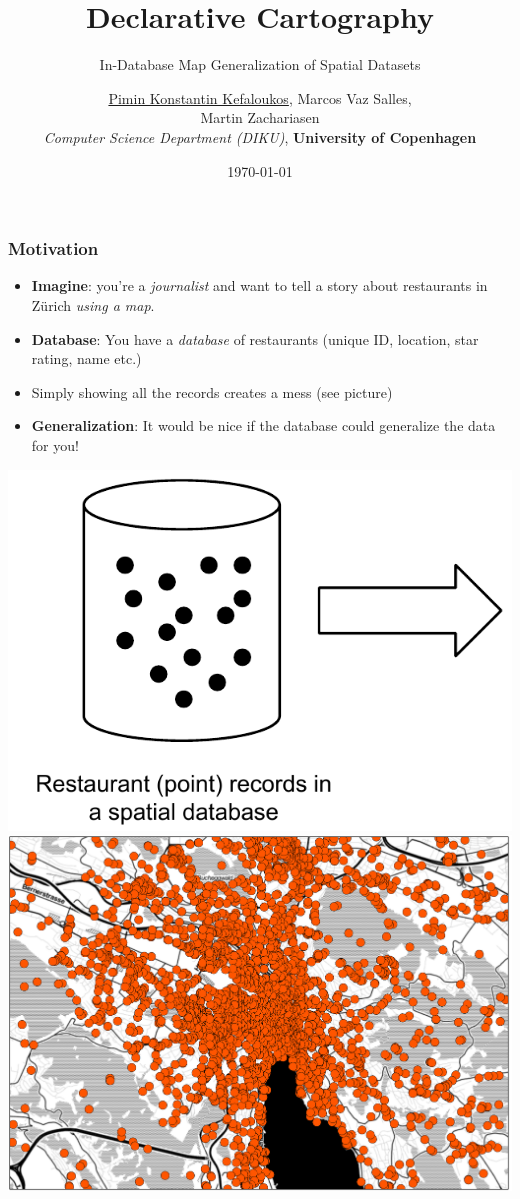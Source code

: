 \documentclass{beamer}
\title{Declarative Cartography}
\subtitle{In-Database Map Generalization of Spatial Datasets}
\author{\underline{Pimin Konstantin Kefaloukos}, Marcos Vaz Salles, \\Martin Zachariasen\\ \small{\emph{Computer Science Department (DIKU)}, \textbf{University of Copenhagen}}}
\date{\today}
\begin{document}
\frame{\titlepage}

\frame
{
  \frametitle{Motivation}
  \begin{itemize}
  \item \textbf{Imagine}: you're a \emph{journalist} and want to tell a story about restaurants in Z\"{u}rich \emph{using a map}.
  \item \textbf{Database}: You have a \emph{database} of restaurants (unique ID, location, star rating, name etc.)
  \item Simply showing all the records creates a mess (see picture)
  \item \textbf{Generalization}: It would be nice if the database could generalize the data for you!
  \end{itemize}
  \includegraphics[scale=0.5]{figs/spatial-database-with-points.pdf} \includegraphics[scale=0.18]{figs/zurich-unfiltered.pdf}
}
\end{document}
